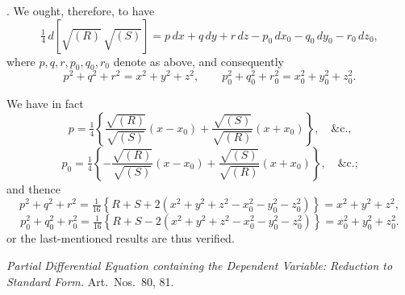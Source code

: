 \documentclass[11pt,a4paper]{article}
\begin{document}
\medskip

. We ought, therefore, to have
\[
\tfrac{1}{4}\,d\!\left[\sqrt{(R)}\,\sqrt{(S)}\right] = p\,dx + q\,dy + r\,dz - p_{0}\,dx_{0} - q_{0}\,dy_{0} - r_{0}\,dz_{0},
\]
where $p, q, r, p_{0}, q_{0}, r_{0}$ denote as above, and consequently
\[
p^{2} + q^{2} + r^{2} = x^{2} + y^{2} + z^{2}, \qquad p_{0}^{2} + q_{0}^{2} + r_{0}^{2} = x_{0}^{2} + y_{0}^{2} + z_{0}^{2}.
\]

\newpage


We have in fact
\[
p = \tfrac{1}{4}\!\left\{ \frac{\sqrt{(R)}}{\sqrt{(S)}}(x - x_{0}) + \frac{\sqrt{(S)}}{\sqrt{(R)}}(x + x_{0}) \right\}, \quad \&\text{c.,}
\]
\[
p_{0} = \tfrac{1}{4}\!\left\{ -\frac{\sqrt{(R)}}{\sqrt{(S)}}(x - x_{0}) + \frac{\sqrt{(S)}}{\sqrt{(R)}}(x + x_{0}) \right\}, \quad \&\text{c.;}
\]
and thence
\[
p^{2} + q^{2} + r^{2} = \tfrac{1}{16}\!\left\{ R + S + 2(x^{2} + y^{2} + z^{2} - x_{0}^{2} - y_{0}^{2} - z_{0}^{2}) \right\} = x^{2} + y^{2} + z^{2},
\]
\[
p_{0}^{2} + q_{0}^{2} + r_{0}^{2} = \tfrac{1}{16}\!\left\{ R + S - 2(x^{2} + y^{2} + z^{2} - x_{0}^{2} - y_{0}^{2} - z_{0}^{2}) \right\} = x_{0}^{2} + y_{0}^{2} + z_{0}^{2}.
\]
or the last-mentioned results are thus verified.

\bigskip

\begin{center}
\emph{Partial Differential Equation containing the Dependent Variable: Reduction to Standard Form.} Art.\ Nos.\ 80, 81.
\end{center}

\medskip
\end{document}
